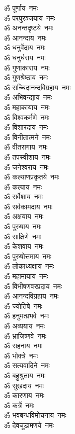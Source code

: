 \begin{multicols}{2}
\begin{flushleft}
ॐ पूर्णाय~नमः\\
ॐ परपुरञ्जयाय~नमः\\
ॐ अनन्तदृष्टये~नमः\\
ॐ आनन्दाय~नमः\hfill{}\\
ॐ धनुर्वेदाय~नमः\\
ॐ धनुर्धराय~नमः\\
ॐ गुणाकाराय~नमः\\
ॐ गुणश्रेष्ठाय~नमः\\
ॐ सच्चिदानन्दविग्रहाय~नमः\\
ॐ अभिवन्द्याय~नमः\\
ॐ महाकायाय~नमः\\
ॐ विश्वकर्मणे~नमः\\
ॐ विशारदाय~नमः\\
ॐ विनीतात्मने~नमः\hfill{}\\
ॐ वीतरागाय~नमः\\
ॐ तपस्वीशाय~नमः\\
ॐ जनेश्वराय~नमः\\
ॐ कल्याणप्रकृतये~नमः\\
ॐ कल्पाय~नमः\\
ॐ सर्वेशाय~नमः\\
ॐ सर्वकामदाय~नमः\\
ॐ अक्षयाय~नमः\\
ॐ पुरुषाय~नमः\\
ॐ साक्षिणे~नमः\hfill{}\\
ॐ केशवाय~नमः\\
ॐ पुरुषोत्तमाय~नमः\\
ॐ लोकाध्यक्षाय~नमः\\
ॐ महामायाय~नमः\\
ॐ विभीषणवरप्रदाय~नमः\\
ॐ आनन्दविग्रहाय~नमः\\
ॐ ज्योतिषे~नमः\\
ॐ हनुमत्प्रभवे~नमः\\
ॐ अव्ययाय~नमः\\
ॐ भ्राजिष्णवे~नमः\hfill{}\\
ॐ सहनाय~नमः\\
ॐ भोक्त्रे~नमः\\
ॐ सत्यवादिने~नमः\\
ॐ बहुश्रुताय~नमः\\
ॐ सुखदाय~नमः\\
ॐ कारणाय~नमः\\
ॐ कर्त्रे~नमः\\
ॐ भवबन्धविमोचनाय~नमः\\
ॐ देवचूडामणये~नमः\\

\end{flushleft}
\end{multicols}
